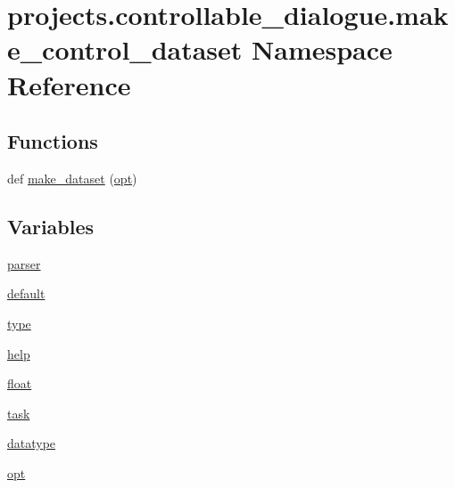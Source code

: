 \hypertarget{namespaceprojects_1_1controllable__dialogue_1_1make__control__dataset}{}\section{projects.\+controllable\+\_\+dialogue.\+make\+\_\+control\+\_\+dataset Namespace Reference}
\label{namespaceprojects_1_1controllable__dialogue_1_1make__control__dataset}
\subsection*{Functions}
\begin{DoxyCompactItemize}
\item 
def \hyperlink{namespaceprojects_1_1controllable__dialogue_1_1make__control__dataset_a8b209e575769f92c93ceb2c06e70fee1}{make\+\_\+dataset} (\hyperlink{namespaceprojects_1_1controllable__dialogue_1_1make__control__dataset_ab945d95ab130dd8f09fea9282bb7513d}{opt})
\end{DoxyCompactItemize}
\subsection*{Variables}
\begin{DoxyCompactItemize}
\item 
\hyperlink{namespaceprojects_1_1controllable__dialogue_1_1make__control__dataset_ad4b34cd0357d91d46706e2a2f86e001e}{parser}
\item 
\hyperlink{namespaceprojects_1_1controllable__dialogue_1_1make__control__dataset_a09f31a921073238daa379c3a4a9c238c}{default}
\item 
\hyperlink{namespaceprojects_1_1controllable__dialogue_1_1make__control__dataset_ac18f1b93e514ccda4429a60f66e78367}{type}
\item 
\hyperlink{namespaceprojects_1_1controllable__dialogue_1_1make__control__dataset_ac64271657fa93683a6004b8145b12050}{help}
\item 
\hyperlink{namespaceprojects_1_1controllable__dialogue_1_1make__control__dataset_aa2b7207688c641dbc094ab44eca27113}{float}
\item 
\hyperlink{namespaceprojects_1_1controllable__dialogue_1_1make__control__dataset_a0bead021e69d59fb4cdff2e7705f1f0e}{task}
\item 
\hyperlink{namespaceprojects_1_1controllable__dialogue_1_1make__control__dataset_ae6fa23d8106a608fbab7aae77d8bac39}{datatype}
\item 
\hyperlink{namespaceprojects_1_1controllable__dialogue_1_1make__control__dataset_ab945d95ab130dd8f09fea9282bb7513d}{opt}
\end{DoxyCompactItemize}


